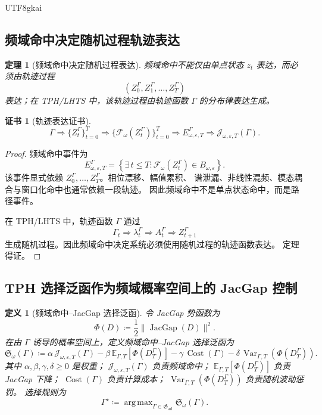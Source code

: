 \documentclass[12pt]{article}
\newtheorem{definition}{定义}[section]
\newtheorem{theorem}{定理}[section]
\newtheorem{Certificate}{证书}[section]
\newcommand{\DefEq}{\coloneqq}
\newcommand{\E}{\mathbb E}
\DeclareMathOperator{\Cost}{Cost}
\DeclareMathOperator{\JacGap}{JacGap}
\DeclareMathOperator{\Var}{Var}
\DeclareMathOperator*{\argmax}{arg\,max}
\begin{document}
\begin{CJK*}{UTF8}{gkai}
\subsection{频域命中决定随机过程轨迹表达}
\label{subsec:frequency-hit-path-process-expression}

\begin{theorem}[频域命中决定随机过程表达]
频域命中不能仅由单点状态 \(z_t\) 表达，而必须由轨迹过程
\[
(Z_0^\Gamma,Z_1^\Gamma,\ldots,Z_T^\Gamma)
\]
表达；在 TPH/LHTS 中，该轨迹过程由轨迹函数 \(\Gamma\) 的分布律表达生成。
\end{theorem}

\begin{Certificate}[轨迹表达证书]
\[
\boxed{
\Gamma
\Rightarrow
\{Z_t^\Gamma\}_{t=0}^{T}
\Rightarrow
\{\mathcal F_\omega(Z_t^\Gamma)\}_{t=0}^{T}
\Rightarrow
E_{\omega,\varepsilon,T}^{\Gamma}
\Rightarrow
\mathcal J_{\omega,\varepsilon,T}(\Gamma).
}
\]
\end{Certificate}

\begin{proof}
频域命中事件为
\[
E_{\omega,\varepsilon,T}^{\Gamma}
=
\left\{
\exists\,t\le T:
\mathcal F_\omega(Z_t^\Gamma)\in B_{\omega,\varepsilon}
\right\}.
\]
该事件显式依赖 \(Z_0^\Gamma,\ldots,Z_T^\Gamma\)。相位漂移、幅值累积、
谱泄漏、非线性混频、模态耦合与窗口化命中也通常依赖一段轨迹。
因此频域命中不是单点状态命中，而是路径事件。

在 TPH/LHTS 中，轨迹函数 \(\Gamma\) 通过
\[
\Gamma_t
\Rightarrow
\lambda_t^\Gamma
\Rightarrow
A_t^\Gamma
\Rightarrow
Z_{t+1}^\Gamma
\]
生成随机过程。因此频域命中决定系统必须使用随机过程的轨迹函数表达。
定理得证。
\end{proof}

\subsection{TPH 选择泛函作为频域概率空间上的 JacGap 控制}
\label{subsec:tph-selection-on-frequency-probability-space}

\begin{definition}[频域命中--JacGap 选择泛函]
令 JacGap 势函数为
\[
\Phi(D)
\DefEq
\frac12\|\JacGap(D)\|^2.
\]
在由 \(\Gamma\) 诱导的概率空间上，定义频域命中--JacGap 选择泛函为
\[
\boxed{
\mathfrak S_\omega(\Gamma)
\DefEq
\alpha\,\mathcal J_{\omega,\varepsilon,T}(\Gamma)
-
\beta\,\E_{\Gamma,T}[\Phi(D_T^\Gamma)]
-
\gamma\,\Cost(\Gamma)
-
\delta\,\Var_{\Gamma,T}(\Phi(D_T^\Gamma)).
}
\]
其中 \(\alpha,\beta,\gamma,\delta\ge0\) 是权重；
\(\mathcal J_{\omega,\varepsilon,T}(\Gamma)\) 负责频域命中；
\(\E_{\Gamma,T}[\Phi(D_T^\Gamma)]\) 负责 JacGap 下降；
\(\Cost(\Gamma)\) 负责计算成本；
\(\Var_{\Gamma,T}(\Phi(D_T^\Gamma))\) 负责随机波动惩罚。
选择规则为
\[
\boxed{
\Gamma^\star
\DefEq
\argmax_{\Gamma\in\mathfrak G_{\mathrm{ad}}}
\mathfrak S_\omega(\Gamma).
}
\]
\end{definition}


\end{CJK*}
\end{document}
